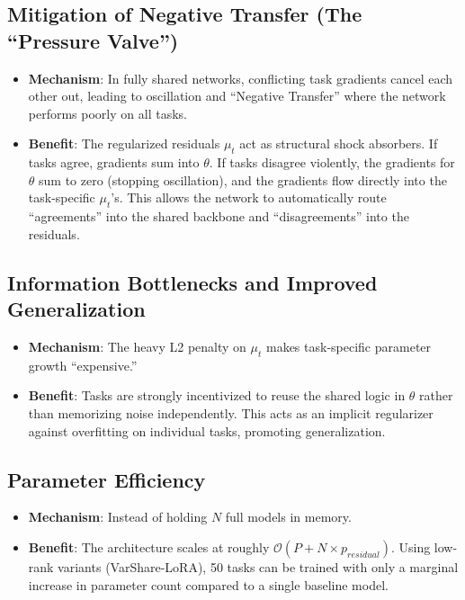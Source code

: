 \documentclass[11pt,a4paper]{article}
\begin{document}
\subsection{Mitigation of Negative Transfer (The ``Pressure Valve'')}
\begin{itemize}
    \item \textbf{Mechanism}: In fully shared networks, conflicting task gradients cancel each other out, leading to oscillation and ``Negative Transfer'' where the network performs poorly on all tasks.
    \item \textbf{Benefit}: The regularized residuals $\mu_t$ act as structural shock absorbers. If tasks agree, gradients sum into $\theta$. If tasks disagree violently, the gradients for $\theta$ sum to zero (stopping oscillation), and the gradients flow directly into the task-specific $\mu_t$'s. This allows the network to automatically route ``agreements'' into the shared backbone and ``disagreements'' into the residuals.
\end{itemize}

\subsection{Information Bottlenecks and Improved Generalization}
\begin{itemize}
    \item \textbf{Mechanism}: The heavy L2 penalty on $\mu_t$ makes task-specific parameter growth ``expensive.''
    \item \textbf{Benefit}: Tasks are strongly incentivized to reuse the shared logic in $\theta$ rather than memorizing noise independently. This acts as an implicit regularizer against overfitting on individual tasks, promoting generalization.
\end{itemize}

\subsection{Parameter Efficiency}
\begin{itemize}
    \item \textbf{Mechanism}: Instead of holding $N$ full models in memory.
    \item \textbf{Benefit}: The architecture scales at roughly $\mathcal{O}(P + N \times p_{residual})$. Using low-rank variants (VarShare-LoRA), 50 tasks can be trained with only a marginal increase in parameter count compared to a single baseline model.
\end{itemize}
\end{document}
